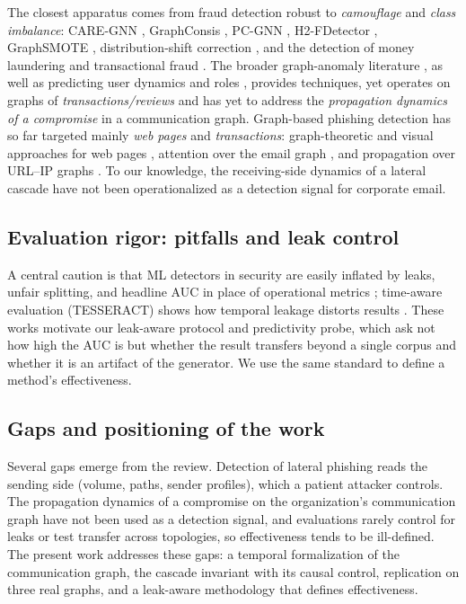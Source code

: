 The closest apparatus comes from fraud detection robust to
\emph{camouflage} and \emph{class imbalance}: CARE-GNN \citep{dou2020enhancing}, GraphConsis \citep{liu2020alleviating},
PC-GNN \citep{liu2021pick}, H2-FDetector \citep{shi2022h2fdetector}, GraphSMOTE \citep{zhao2021graphsmote},
distribution-shift correction \citep{gao2023alleviating,tang2022rethinking}, and the detection of money laundering
and transactional fraud \citep{weber2019antimoney,li2022ttagn,rayana2015collective}. The broader graph-anomaly
literature \citep{ding2019deep,park2020unsupervised,liu2021anomaly,ma2021comprehensive,zhang2021mcgc,li2025umgad}, as well as predicting user dynamics and roles
\citep{kumar2019predicting,wu2020who,li2022pdgnn}, provides techniques, yet operates on graphs of
\emph{transactions/reviews} and has yet to address the \emph{propagation dynamics of a compromise} in a
communication graph. Graph-based phishing detection has so far
targeted mainly \emph{web pages} and \emph{transactions}: graph-theoretic and visual approaches for web pages
\citep{tan2020graph,lin2021phishpedia,abdelnabi2020visualphishnet}, attention over the email graph
\citep{safran2025phishinggnn}, and propagation over URL--IP graphs
\citep{guo2025efficient,li2022pdgnn}. To our knowledge, the receiving-side dynamics of a lateral cascade have
not been operationalized as a detection signal for corporate email.

\subsection{Evaluation rigor: pitfalls and leak control}
\label{sec:rw-eval}
A central caution is that ML detectors in security are easily inflated by leaks, unfair splitting, and headline
AUC in place of operational metrics \citep{arp2022dos}; time-aware evaluation (TESSERACT) shows how temporal
leakage distorts results \citep{pendlebury2019tesseract}. These works motivate our leak-aware protocol and
predictivity probe, which ask not how high the AUC is but whether the result transfers beyond a single corpus and
whether it is an artifact of the generator. We use the same standard to define a method's effectiveness.

\subsection{Gaps and positioning of the work}
\label{sec:rw-gap}
Several gaps emerge from the review. Detection of lateral phishing reads the sending side (volume, paths,
sender profiles), which a patient attacker controls. The propagation dynamics of a compromise on the
organization's communication graph have not been used as a detection signal, and evaluations rarely control for
leaks or test transfer across topologies, so effectiveness tends to be ill-defined. The present work addresses
these gaps: a temporal formalization of the communication graph, the cascade invariant with its causal control,
replication on three real graphs, and a leak-aware methodology that defines effectiveness.
